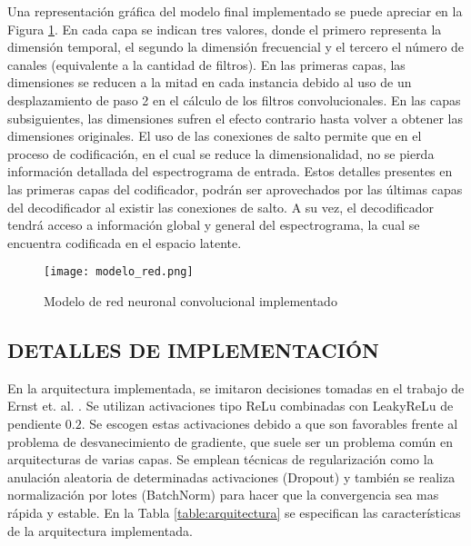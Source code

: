 Una representación gráfica del modelo final implementado se puede apreciar en la Figura \ref{fig:modelo}. En cada capa se indican tres valores, donde el primero representa la dimensión temporal, el segundo la dimensión frecuencial y el tercero el número de canales (equivalente a la cantidad de filtros). En las primeras capas, las dimensiones se reducen a la mitad en cada instancia debido al uso de un desplazamiento de paso 2 en el cálculo de los filtros convolucionales. En las capas subsiguientes, las dimensiones sufren el efecto contrario hasta volver a obtener las dimensiones originales. El uso de las conexiones de salto permite que en el proceso de codificación, en el cual se reduce la dimensionalidad, no se pierda información detallada del espectrograma de entrada. Estos detalles presentes en las primeras capas del codificador, podrán ser aprovechados por las últimas capas del decodificador al existir las conexiones de salto. A su vez, el decodificador tendrá acceso a información global y general del espectrograma, la cual se encuentra codificada en el espacio latente.

\begin{figure}[H]
	\centering{}
	\texttt{[image: modelo\_red.png]}
	\caption{Modelo de red neuronal convolucional implementado}
	\label{fig:modelo}
\end{figure}

\subsection[Detalles de implementación]{DETALLES DE IMPLEMENTACIÓN}

En la arquitectura implementada, se imitaron decisiones tomadas en el trabajo de Ernst et. al. \cite{FCN}. Se utilizan activaciones tipo ReLu combinadas con LeakyReLu  de pendiente $0.2$. Se escogen estas activaciones debido a que son favorables frente al problema de desvanecimiento de gradiente, que suele ser un problema común en arquitecturas de varias capas. Se emplean técnicas de regularización como la anulación aleatoria de determinadas activaciones (Dropout) y también se realiza normalización por lotes (BatchNorm) para hacer que la convergencia sea mas rápida y estable. En la Tabla \ref{table:arquitectura} se especifican las características de la arquitectura implementada. 


